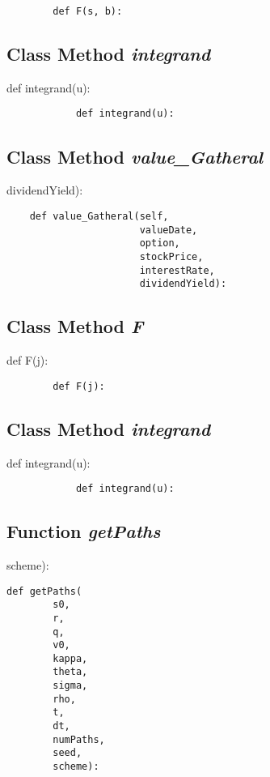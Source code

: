 \documentclass[twoside,11pt]{book}
\begin{document}
\begin{lstlisting}
        def F(s, b):
\end{lstlisting}

\subsection{Class Method {\it integrand}}
def integrand(u):

\begin{lstlisting}
            def integrand(u):
\end{lstlisting}

\subsection{Class Method {\it value\_Gatheral}}
dividendYield):

\begin{lstlisting}
    def value_Gatheral(self,
                       valueDate,
                       option,
                       stockPrice,
                       interestRate,
                       dividendYield):
\end{lstlisting}

\subsection{Class Method {\it F}}
def F(j):

\begin{lstlisting}
        def F(j):
\end{lstlisting}

\subsection{Class Method {\it integrand}}
def integrand(u):

\begin{lstlisting}
            def integrand(u):
\end{lstlisting}

\subsection{Function {\it getPaths}}
scheme):

\begin{lstlisting}
def getPaths(
        s0,
        r,
        q,
        v0,
        kappa,
        theta,
        sigma,
        rho,
        t,
        dt,
        numPaths,
        seed,
        scheme):
\end{lstlisting}
\end{document}
